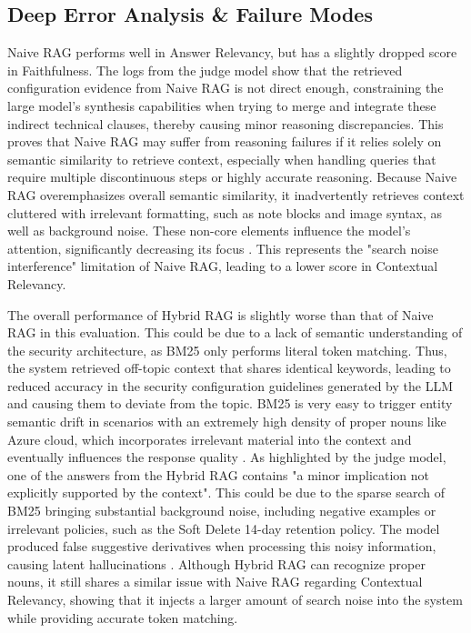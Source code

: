 \documentclass[11pt]{article}
\begin{document}
\subsection{Deep Error Analysis \& Failure Modes}

Naive RAG performs well in Answer Relevancy, but has a slightly dropped score in Faithfulness. The logs from the judge model show that the retrieved configuration evidence from Naive RAG is not direct enough, constraining the large model's synthesis capabilities when trying to merge and integrate these indirect technical clauses, thereby causing minor reasoning discrepancies. This proves that Naive RAG may suffer from reasoning failures if it relies solely on semantic similarity to retrieve context, especially when handling queries that require multiple discontinuous steps or highly accurate reasoning. Because Naive RAG overemphasizes overall semantic similarity, it inadvertently retrieves context cluttered with irrelevant formatting, such as note blocks and image syntax, as well as background noise. These non-core elements influence the model's attention, significantly decreasing its focus \citep{shi2023large}. This represents the "search noise interference" limitation of Naive RAG, leading to a lower score in Contextual Relevancy.

The overall performance of Hybrid RAG is slightly worse than that of Naive RAG in this evaluation. This could be due to a lack of semantic understanding of the security architecture, as BM25 only performs literal token matching. Thus, the system retrieved off-topic context that shares identical keywords, leading to reduced accuracy in the security configuration guidelines generated by the LLM and causing them to deviate from the topic. BM25 is very easy to trigger entity semantic drift in scenarios with an extremely high density of proper nouns like Azure cloud, which incorporates irrelevant material into the context and eventually influences the response quality \citep{thakur2021beir}. As highlighted by the judge model, one of the answers from the Hybrid RAG contains "a minor implication not explicitly supported by the context". This could be due to the sparse search of BM25 bringing substantial background noise, including negative examples or irrelevant policies, such as the Soft Delete 14-day retention policy. The model produced false suggestive derivatives when processing this noisy information, causing latent hallucinations \citep{liu2024lost}. Although Hybrid RAG can recognize proper nouns, it still shares a similar issue with Naive RAG regarding Contextual Relevancy, showing that it injects a larger amount of search noise into the system while providing accurate token matching.
\end{document}
